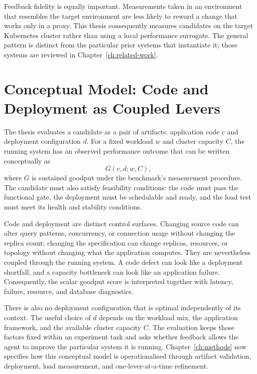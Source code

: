Feedback fidelity is equally important. Measurements taken in an environment
that resembles the target environment are less likely to reward a change that
works only in a proxy. This thesis consequently measures candidates on the
target Kubernetes cluster rather than using a local performance surrogate.
The general pattern is distinct from the particular prior systems that
instantiate it; those systems are reviewed in Chapter~\ref{ch:related-work}.


\section{Conceptual Model: Code and Deployment as Coupled Levers}
\label{sec:background-synthesis}

The thesis evaluates a candidate as a pair of artifacts: application code
$c$ and deployment configuration $d$. For a fixed workload $w$ and cluster
capacity $C$, the running system has an observed performance outcome that can
be written conceptually as
\[
  G(c,d;w,C),
\]
where $G$ is sustained goodput under the benchmark's measurement procedure.
The candidate must also satisfy feasibility conditions: the code must pass
the functional gate, the deployment must be schedulable and ready, and the
load test must meet its health and stability conditions.

Code and deployment are distinct control surfaces. Changing source code can
alter query patterns, concurrency, or connection usage without changing the
replica count; changing the specification can change replicas, resources, or
topology without changing what the application computes. They are nevertheless
coupled through the running system. A code defect can look like a deployment
shortfall, and a capacity bottleneck can look like an application failure.
Consequently, the scalar goodput score is interpreted together with latency,
failure, resource, and database diagnostics.

There is also no deployment configuration that is optimal independently of its
context. The useful choice of $d$ depends on the workload mix, the application
framework, and the available cluster capacity $C$. The evaluation keeps those
factors fixed within an experiment task and asks whether feedback allows the
agent to improve the particular system it is running. Chapter~\ref{ch:methods}
now specifies how this conceptual model is operationalised through artifact
validation, deployment, load measurement, and one-lever-at-a-time refinement.
